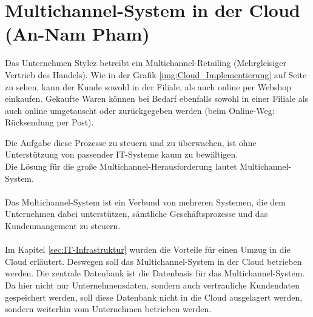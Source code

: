 \section{Multichannel-System in der Cloud (An-Nam Pham)}
Das Unternehmen Stylez betreibt ein Multichannel-Retailing (Mehrgleisiger Vertrieb des Handels). Wie in der Grafik \ref{img:Cloud_Implementierung} auf Seite \pageref{img:Cloud_Implementierung} zu sehen, kann der Kunde sowohl in der Filiale, als auch online per Webshop einkaufen. Gekaufte Waren können bei Bedarf ebenfalls sowohl in einer Filiale als auch online umgetauscht oder zurückgegeben werden (beim Online-Weg: Rücksendung per Post).

Die Aufgabe diese Prozesse zu steuern und zu überwachen, ist ohne Unterstützung von passender IT-Systeme kaum zu bewältigen.\\
Die Lösung für die große Multichannel-Herausforderung lautet Multichannel-System.\\
\\
Das Multichannel-System ist ein Verbund von mehreren Systemen, die dem Unternehmen dabei unterstützen, sämtliche Geschäftsprozesse und das Kundenmangement zu steuern.\\
\\
Im Kapitel \ref{sec:IT-Infrastruktur} wurden die Vorteile für einen Umzug in die Cloud erläutert.
Deswegen soll das Multichannel-System in der Cloud betrieben werden.
Die zentrale Datenbank ist die Datenbasis für das Multichannel-System. Da hier nicht nur Unternehmensdaten, sondern auch vertrauliche Kundendaten gespeichert werden, soll diese Datenbank nicht in die Cloud ausgelagert werden, sondern weiterhin vom Unternehmen betrieben werden.

